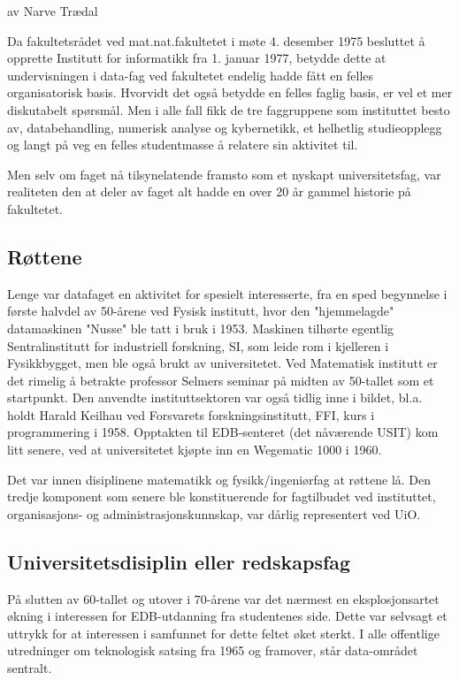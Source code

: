 \documentclass[../main.tex]{subfiles}
\begin{document}
av Narve Trædal

Da fakultetsrådet ved mat.nat.fakultetet i møte 4. desember 1975 besluttet å opprette Institutt for informatikk fra 1. januar 1977, betydde dette at undervisningen i data-fag ved fakultetet endelig hadde fått en felles organisatorisk basis. Hvorvidt det også betydde en felles faglig basis, er vel et mer diskutabelt spørsmål. Men i alle fall fikk de tre faggruppene som instituttet besto av, databehandling, numerisk analyse og kybernetikk, et helhetlig studieopplegg og langt på veg en felles studentmasse å relatere sin aktivitet til.

Men selv om faget nå tilsynelatende framsto som et nyskapt universitetsfag, var realiteten den at deler av faget alt hadde en over 20 år gammel historie på fakultetet.

\subsection{Røttene}
Lenge var datafaget en aktivitet for spesielt interesserte, fra en sped begynnelse i første halvdel av 50-årene ved Fysisk institutt, hvor den "hjemmelagde" datamaskinen "Nusse" ble tatt i bruk i 1953. Maskinen tilhørte egentlig Sentralinstitutt for industriell forskning, SI, som leide rom i kjelleren i Fysikkbygget, men ble også brukt av universitetet. Ved Matematisk institutt er det rimelig å betrakte professor Selmers seminar på midten av 50-tallet som et startpunkt. Den anvendte instituttsektoren var også tidlig inne i bildet, bl.a. holdt Harald Keilhau ved Forsvarets forskningsinstitutt, FFI, kurs i programmering i 1958. Opptakten til EDB-senteret (det nåværende USIT) kom litt senere, ved at universitetet kjøpte inn en Wegematic 1000 i 1960.

Det var innen disiplinene matematikk og fysikk/ingeniørfag at røttene lå. Den tredje komponent som senere ble konstituerende for fagtilbudet ved instituttet, organisasjons- og administrasjonskunnskap, var dårlig representert ved UiO.

\subsection{Universitetsdisiplin eller redskapsfag}
På slutten av 60-tallet og utover i 70-årene var det nærmest en eksplosjonsartet økning i interessen for EDB-utdanning fra studentenes side. Dette var selvsagt et uttrykk for at interessen i samfunnet for dette feltet øket sterkt. I alle offentlige utredninger om teknologisk satsing fra 1965 og framover, står data-området sentralt.
\end{document}
